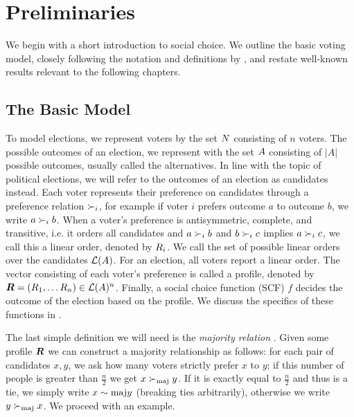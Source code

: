 \chapter{Preliminaries}
\label{chap: preliminaries}

We begin with a short introduction to social choice. We outline the basic
voting model, closely following the notation and definitions by
\citet{brandtHandbookComputationalSocial2016}, and restate well-known results
relevant to the following chapters.

\section{The Basic Model}

To model elections, we represent voters by the set $N$ consisting of $n$
voters. The possible outcomes of an election, we represent with the set
$A$ consisting of $|A|$ possible outcomes, usually called the alternatives. In line with the topic of political elections, we will
refer to the outcomes of an election as candidates instead. Each voter represents
their preference on candidates through a preference relation $\succ_i$, for
example if voter $i$ prefers outcome $a$ to outcome $b$, we write $a \succ_{i} b$.
When a voter's preference is antisymmetric, complete, and transitive, i.e. it orders
all candidates and $a \succ_i b$ and $b \succ_i c$ implies $a \succ_i c$, we
call this a linear order, denoted by $R_i$. We call the set of possible linear orders over the
candidates $\mathcal{L}(A)$.  For an election, all voters report a
linear order. The vector consisting of each voter's preference is called a
profile, denoted by $\boldsymbol{R} = (R_1, \dots R_{n}) \in \mathcal{L}(A)^{n}$. Finally, a social choice function (SCF)
$f$ decides the outcome of the election based on the profile. We discuss the
specifics of these functions in .

The last simple definition we will need is the \emph{majority relation}
\cite{alma990028050780205131}. Given some profile $\boldsymbol{R}$ we can
construct a majority relationship as follows: for each pair of candidates
$x,y$, we ask how many voters strictly prefer $x$ to $y$; if this number of people is
greater than $\frac{n}{2}$ we get $x  \succ_{\textnormal{maj}} y$. If it is exactly equal to
$\frac{n}{2}$ and thus is a tie, we simply write $x \sim{\textnormal{maj}} y$ (breaking ties arbitrarily), otherwise we write $y \succ_{\textnormal{maj}} x$. We proceed with an
example.

